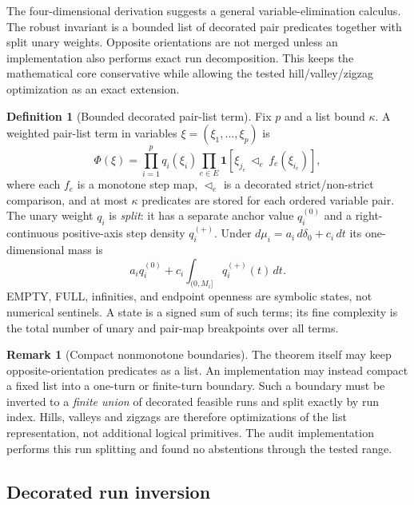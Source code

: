 \documentclass[12pt,a4paper]{article}
\theoremstyle{definition}
\newtheorem{definition}[theorem]{Definition}
\newtheorem{remark}[theorem]{Remark}
\newcommand{\1}{\mathbf 1}
\begin{document}
The four-dimensional derivation suggests a general variable-elimination calculus. The robust invariant is a bounded list of decorated pair predicates together with split unary weights. Opposite orientations are not merged unless an implementation also performs exact run decomposition. This keeps the mathematical core conservative while allowing the tested hill/valley/zigzag optimization as an exact extension.

\begin{definition}[Bounded decorated pair-list term]          \label{def:pairterm}
Fix $p$ and a list bound $\kappa$. A weighted pair-list term in variables $\xi=(\xi_1,\ldots,\xi_p)$ is
\begin{equation}
\Phi(\xi)=\prod_{i=1}^p q_i(\xi_i)
          \prod_{e\in E}\mathbf 1[\xi_{j_e}\,\triangleleft_e\, f_e(\xi_{i_e})],       \label{eq:pairterm}
\end{equation}
where each $f_e$ is a monotone step map, $\triangleleft_e$ is a decorated strict/non-strict comparison, and at most $\kappa$ predicates are stored for each ordered variable pair. The unary weight $q_i$ is \emph{split}: it has a separate anchor value $q_i^{(0)}$ and a right-continuous positive-axis step density $q_i^{(+)}$. Under $d\mu_i=a_i\,d\delta_0+c_i\,dt$ its one-dimensional mass is
\[
a_iq_i^{(0)}+c_i\int_{(0,M_i]}q_i^{(+)}(t)\,dt.
\]
EMPTY, FULL, infinities, and endpoint openness are symbolic states, not numerical sentinels. A state is a signed sum of such terms; its fine complexity is the total number of unary and pair-map breakpoints over all terms.
\end{definition}

\begin{remark}[Compact nonmonotone boundaries]
The theorem itself may keep opposite-orientation predicates as a list. An implementation may instead compact a fixed list into a one-turn or finite-turn boundary. Such a boundary must be inverted to a \emph{finite union} of decorated feasible runs and split exactly by run index. Hills, valleys and zigzags are therefore optimizations of the list representation, not additional logical primitives. The audit implementation performs this run splitting and found no abstentions through the tested range.
\end{remark}

\subsection{Decorated run inversion}
\end{document}

